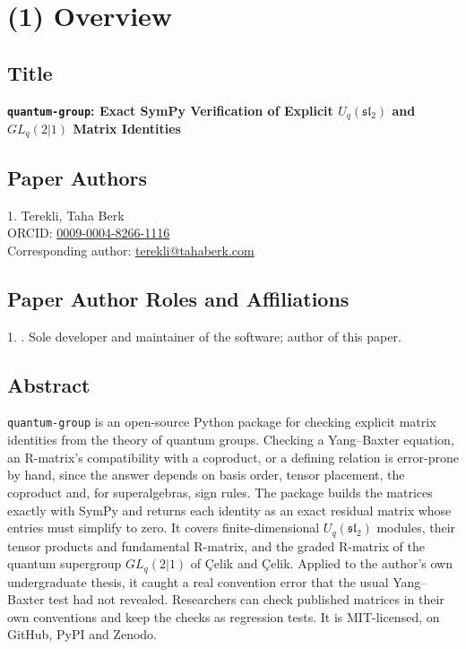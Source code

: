 \documentclass[11pt,a4paper]{article}
\newcommand{\pkg}{\texttt{quantum-group}}
\newcommand{\Uq}{U_q(\mathfrak{sl}_2)}
\newcommand{\GL}{GL_q(2|1)}
\begin{document}
\section*{(1) Overview}

\subsection*{Title}

{\Large\bfseries \pkg: Exact SymPy Verification of Explicit $\Uq$ and $\GL$ Matrix Identities\par}

\subsection*{Paper Authors}

1. Terekli, Taha Berk \\ ORCID: \href{https://orcid.org/0009-0004-8266-1116}{0009-0004-8266-1116}\\ Corresponding author: \href{mailto:terekli@tahaberk.com}{terekli@tahaberk.com}

\subsection*{Paper Author Roles and Affiliations}

1. \AuthorAffiliation. Sole developer and maintainer of the software; author of this paper.

\subsection*{Abstract}

\pkg{} is an open-source Python package for checking explicit matrix identities from the theory of quantum groups. Checking a Yang--Baxter equation, an R-matrix's compatibility with a coproduct, or a defining relation is error-prone by hand, since the answer depends on basis order, tensor placement, the coproduct and, for superalgebras, sign rules. The package builds the matrices exactly with SymPy and returns each identity as an exact residual matrix whose entries must simplify to zero. It covers finite-dimensional $\Uq$ modules, their tensor products and fundamental R-matrix, and the graded R-matrix of the quantum supergroup $\GL$ of Çelik and Çelik. Applied to the author's own undergraduate thesis, it caught a real convention error that the usual Yang--Baxter test had not revealed. Researchers can check published matrices in their own conventions and keep the checks as regression tests. It is MIT-licensed, on GitHub, PyPI and Zenodo.
\end{document}
